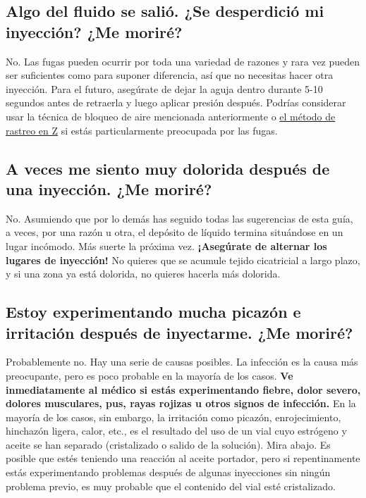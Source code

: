\documentclass{article}
\begin{document}
\subsection{Algo del fluido se salió. ¿Se desperdició mi inyección? ¿Me moriré?}

No. Las fugas pueden ocurrir por toda una variedad de razones y rara vez pueden ser suficientes como para suponer diferencia, así que no necesitas hacer otra inyección. Para el futuro, asegúrate de dejar la aguja dentro durante 5-10 segundos antes de retraerla y luego aplicar presión después. Podrías considerar usar la técnica de bloqueo de aire mencionada anteriormente o \href{https://www.nurse.com/nursing-resources/definitions/what-is-z-track-method/}{el método de rastreo en Z} si estás particularmente preocupada por las fugas.

\subsection{A veces me siento muy dolorida después de una inyección. ¿Me moriré?}

No. Asumiendo que por lo demás has seguido todas las sugerencias de esta guía, a veces, por una razón u otra, el depósito de líquido termina situándose en un lugar incómodo. Más suerte la próxima vez. \textbf{¡Asegúrate de alternar los lugares de inyección!} No quieres que se acumule tejido cicatricial a largo plazo, y si una zona ya está dolorida, no quieres hacerla más dolorida.

\subsection{Estoy experimentando mucha picazón e irritación después de inyectarme. ¿Me moriré?}

Probablemente no. Hay una serie de causas posibles. La infección es la causa más preocupante, pero es poco probable en la mayoría de los casos. \textbf{Ve inmediatamente al médico si estás experimentando fiebre, dolor severo, dolores musculares, pus, rayas rojizas u otros signos de infección.} En la mayoría de los casos, sin embargo, la irritación como picazón, enrojecimiento, hinchazón ligera, calor, etc., es el resultado del uso de un vial cuyo estrógeno y aceite se han separado (cristalizado o salido de la solución). Mira abajo. Es posible que estés teniendo una reacción al aceite portador, pero si repentinamente estás experimentando problemas después de algunas inyecciones sin ningún problema previo, es muy probable que el contenido del vial esté cristalizado.
\end{document}
